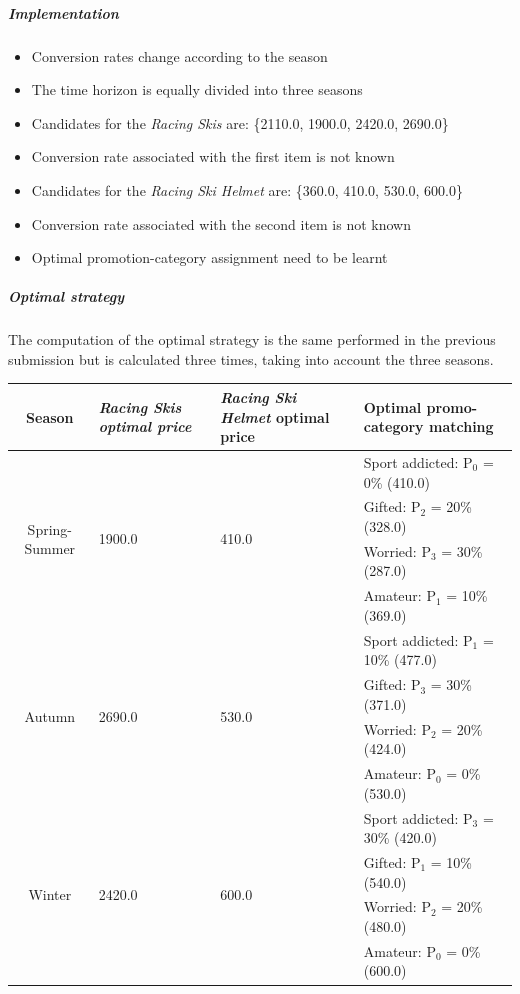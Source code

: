 \subparagraph{Implementation} 
\begin{itemize}
	\item Conversion rates change according to the season
	\item The time horizon is equally divided into three seasons
	\item Candidates for the \textit{Racing Skis} are: \{2110.0, 1900.0, 2420.0, 2690.0\}
	\item Conversion rate associated with the first item is not known
	\item Candidates for the \textit{Racing Ski Helmet} are: \{360.0, 410.0, 530.0, 600.0\}
	\item Conversion rate associated with the second item is not known
	\item Optimal promotion-category assignment need to be learnt
\end{itemize}
\subparagraph{Optimal strategy}
The computation of the optimal strategy is the same performed in the previous submission but is calculated three times, taking into account the three seasons.
\begin{center}
	\begin{tabular}{|c|p{4cm}|p{4cm}|p{4cm}|} 
	\hline
	Season & \textit{Racing Skis optimal price} & \textit{Racing Ski Helmet} optimal price & Optimal promo-category matching \\ \hline
	\multirow{4}{*}{Spring-Summer} & \multirow{4}{*}{1900.0} & \multirow{4}{*}{410.0} & Sport addicted: P$_0$ = 0\% (410.0)  \\ 
								   & 					   &                      & Gifted: P$_2$ = 20\% (328.0)          \\ 
								   & 					   &                      & Worried: P$_3$ = 30\% (287.0)         \\
								   & 					   &                      & Amateur: P$_1$ = 10\% (369.0)         \\ \hline
	\multirow{4}{*}{Autumn} & \multirow{4}{*}{2690.0} & \multirow{4}{*}{530.0}  & Sport addicted: P$_1$ = 10\% (477.0)\\ 
								   & 					   &                      & Gifted: P$_3$ = 30\% (371.0)         \\ 
								   & 					   &                      & Worried: P$_2$ = 20\% (424.0)         \\
								   & 					   &                      & Amateur: P$_0$ = 0\% (530.0)         \\ \hline
	\multirow{4}{*}{Winter} & \multirow{4}{*}{2420.0} & \multirow{4}{*}{600.0}  & Sport addicted: P$_3$ = 30\% (420.0)\\ 
								   & 					   &                      & Gifted: P$_1$ = 10\% (540.0)         \\ 
								   & 					   &                      & Worried: P$_2$ = 20\% (480.0)         \\
								   & 					   &                      & Amateur: P$_0$ = 0\% (600.0)          \\ \hline
	\end{tabular}
\end{center}

